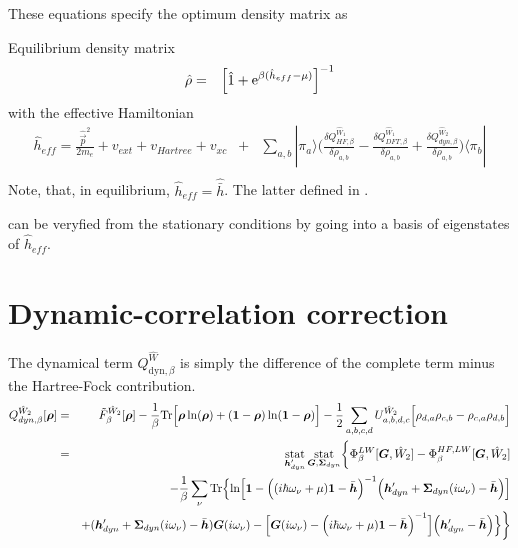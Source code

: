 \documentclass[11pt,a4paper]{report}
\begin{document}
These equations specify the optimum density matrix as
\begin{myshadowminipage}{Equilibrium density matrix}
\begin{eqnarray}
\hat{\rho}&=&\left[\hat{1}+\mathrm{e}^{\beta(\hat{h}_{eff}-\mu)}\right]^{-1}
\label{eq:rhoopt}
\end{eqnarray}
with the effective Hamiltonian
\begin{eqnarray}
\hat{h}_{eff}=\frac{\hat{\vec{p}}^2}{2m_e}+v_{ext}+v_{Hartree}+v_{xc}
&+&\sum_{a,b}|\pi_a\rangle\biggl(
\frac{\delta Q^{\hat{W}_1}_{HF,\beta}}{\delta\rho_{a,b}}
-\frac{\delta Q^{\hat{W}_1}_{DFT,\beta}}{\delta\rho_{a,b}}
+\frac{\delta Q^{\hat{W}_2}_{dyn,\beta}}{\delta\rho_{a,b}}
\biggr)\langle\pi_b|
\nonumber\\
\end{eqnarray}
Note, that, in equilibrium, $\hat{h}_{eff}=\hat{\bar{h}}$. The latter
defined in .
\end{myshadowminipage}
 can be veryfied from the stationary conditions by going
into a basis of eigenstates of $\hat{h}_{eff}$.

\section{Dynamic-correlation correction}
\label{sec:dyncorelcorr}
The dynamical term
$Q_{\text{dyn},\beta}^{\hat{W}}$
is simply the difference of the complete term minus the Hartree-Fock
contribution.
\begin{eqnarray}
Q^{\hat{W}_2}_{dyn,\beta}[\bm{\rho}]
&=&\tilde{F}^{\hat{W}_2}_\beta[\bm{\rho}]
-
\frac{1}{\beta}\mathrm{Tr}\Bigl[
\bm{\rho}\ln(\bm{\rho})+(\bm{1}-\bm{\rho})\ln(\bm{1}-\bm{\rho})\Bigr]
-
\frac{1}{2}\sum_{a,b,c,d}U^{\hat{W}_2}_{a,b,d,c}
\Bigl[\rho_{d,a}\rho_{c,b}-\rho_{c,a}\rho_{d,b}\Bigr]
\nonumber\\
&=&
\operatorname*{stat}_{\bm{h}'_{dyn}}\operatorname*{stat}_{\bm{G},\bm{\Sigma}_{dyn}}
\biggl\lbrace
\Phi^{LW}_\beta[\bm{G},\hat{W}_2]-\Phi^{HF,LW}_\beta[\bm{G},\hat{W}_2]
\nonumber\\
&&-\frac{1}{\beta}\sum_\nu\mathrm{Tr}\Bigl\lbrace
\ln\Bigl[
\bm{1}-
\Bigl((i\hbar\omega_\nu+\mu)\bm{1}-\bar{\bm{h}}\Bigr)^{-1}
\Bigl(\bm{h}'_{dyn}+\bm{\Sigma}_{dyn}(i\omega_\nu)-\bar{\bm{h}}\Bigr)
\Bigr]
\nonumber\\&&
+(\bm{h}'_{dyn}+\bm{\Sigma}_{dyn}(i\omega_\nu)-\bar{\bm{h}})\bm{G}(i\omega_\nu)
-
\Bigl[
\bm{G}(i\omega_\nu)
-\Bigl(i\hbar\omega_\nu+\mu)\bm{1}-\bar{\bm{h}}\Bigr)^{-1}
\Bigr]
\Bigl(\bm{h}'_{dyn}-\bar{\bm{h}}\Bigr)\Bigr\rbrace
\biggr\rbrace
\nonumber\\
\label{eq:dmf1greena}
\end{eqnarray}
\end{document}
